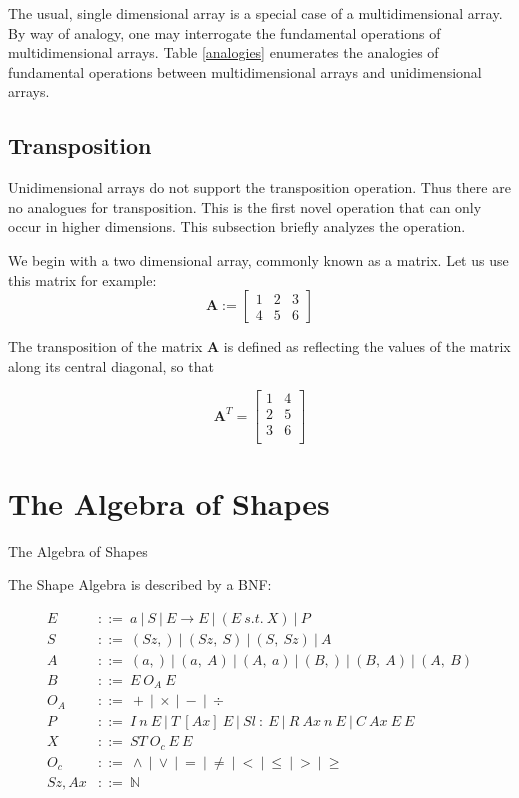 \documentclass{article}
\begin{document}
The usual, single dimensional array is a special case of a multidimensional array. By way of analogy, one may interrogate the fundamental operations of multidimensional arrays. Table \ref{analogies} enumerates the analogies of fundamental operations between multidimensional arrays and unidimensional arrays.


\subsection{Transposition}

Unidimensional arrays do not support the transposition operation. Thus there are no analogues for transposition. This is the first novel operation that can only occur in higher dimensions. This subsection briefly analyzes the operation.

We begin with a two dimensional array, commonly known as a matrix. Let us use this matrix for example:
\begin{equation*}
  \mathbf{A} :=
\begin{bmatrix}
  1 & 2 & 3\\
  4 & 5 & 6
\end{bmatrix}
\end{equation*}

The transposition of the matrix $\mathbf{A}$ is defined as reflecting the values of the matrix along its central diagonal, so that

\begin{equation*}
  \mathbf{A}^T =
  \begin{bmatrix}
    1 & 4\\
    2 & 5\\
    3 & 6\\
  \end{bmatrix}
\end{equation*}

\section {The Algebra of Shapes}

The Algebra of Shapes

The Shape Algebra is described by a BNF:

\begin{align*}
  E &::=\ a\ |\ S\ |\ E \rightarrow E\ |\ (E\ s.t.\ X)\ |\ P \\
  S &::=\ (Sz,)\ |\ (Sz,\ S)\ |\ (S,\ Sz)\ |\ A \\
  A &::=\ (a,)\ |\ (a,\ A)\ |\ (A,\ a)\ |\ (B,)\ |\ (B,\ A)\ |\ (A,\ B)\\
  B &::=\ E\ O_A\ E \\
  O_A &::=\ +\ |\ \times\ |\ -\ |\ \div \\
  P &::=\ I\ n\ E\ |\ T\ [Ax]\ E\ |\ Sl\ :\ E\ |\ R\ Ax\ n\ E\ |\ C\ Ax\ E\ E\\
  X &::=\ ST\ O_c\ E\ E\\
  O_c &::=\ \wedge\ |\ \vee\ |\ =\ |\ \neq\ |\ <\ |\ \leq\ |\ >\ |\ \geq\\
  Sz, Ax &::=\ \mathbb{N}
\end{align*}
\end{document}
